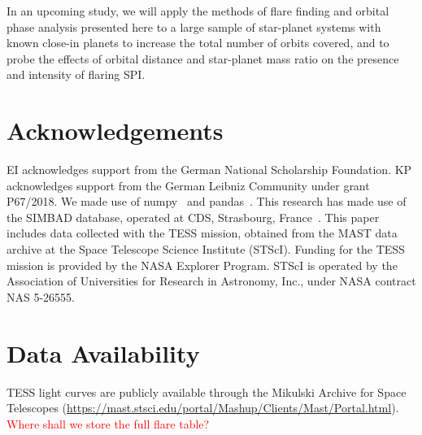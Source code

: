 \documentclass[fleqn,usenatbib,letters]{mnras}%
\begin{document}
In an upcoming study, we will apply the methods of flare finding and orbital phase analysis presented here to a large sample of star-planet systems with known close-in planets to increase the total number of orbits covered, and to probe the effects of orbital distance and star-planet mass ratio on the presence and intensity of flaring SPI.
\section*{Acknowledgements}
EI acknowledges support from the German National Scholarship Foundation. KP acknowledges support from the German Leibniz Community under grant P67/2018. We made use of numpy~\citep{numpy2020} and pandas~\citep{pandas2010,pandas2020software}. This research has made use of the SIMBAD database, operated at CDS, Strasbourg, France~\citep{wenger2000}. This paper includes data collected with the TESS mission, obtained from the MAST data archive at the Space Telescope Science Institute (STScI). Funding for the TESS mission is provided by the NASA Explorer Program. STScI is operated by the Association of Universities for Research in Astronomy, Inc., under NASA contract NAS 5-26555.

\section*{Data Availability}
TESS light curves are publicly available through the Mikulski Archive for Space Telescopes (\url{https://mast.stsci.edu/portal/Mashup/Clients/Mast/Portal.html}).
\textcolor{red}{Where shall we store the full flare table?}


\end{document}
